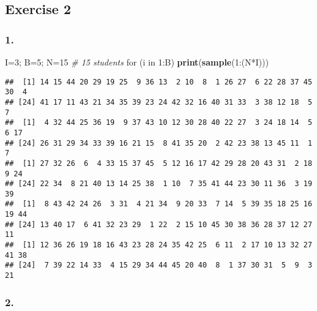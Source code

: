 \documentclass[11pt,]{article}
\newenvironment{Shaded}{\begin{snugshade}}{\end{snugshade}}
\newcommand{\KeywordTok}[1]{\textcolor[rgb]{0.13,0.29,0.53}{\textbf{{#1}}}}
\newcommand{\DecValTok}[1]{\textcolor[rgb]{0.00,0.00,0.81}{{#1}}}
\newcommand{\CommentTok}[1]{\textcolor[rgb]{0.56,0.35,0.01}{\textit{{#1}}}}
\newcommand{\NormalTok}[1]{{#1}}
\begin{document}
\subsection{Exercise 2}\label{exercise-2}

\subsubsection{1.}\label{section-5}

\begin{Shaded}
\begin{Highlighting}[]
\NormalTok{I=}\DecValTok{3}\NormalTok{; B=}\DecValTok{5}\NormalTok{; N=}\DecValTok{15} \CommentTok{# 15 students}
\NormalTok{for (i in }\DecValTok{1}\NormalTok{:B) }\KeywordTok{print}\NormalTok{(}\KeywordTok{sample}\NormalTok{(}\DecValTok{1}\NormalTok{:(N*I)))}
\end{Highlighting}
\end{Shaded}

\begin{verbatim}
##  [1] 14 15 44 20 29 19 25  9 36 13  2 10  8  1 26 27  6 22 28 37 45 30  4
## [24] 41 17 11 43 21 34 35 39 23 24 42 32 16 40 31 33  3 38 12 18  5  7
##  [1]  4 32 44 25 36 19  9 37 43 10 12 30 28 40 22 27  3 24 18 14  5  6 17
## [24] 26 31 29 34 33 39 16 21 15  8 41 35 20  2 42 23 38 13 45 11  1  7
##  [1] 27 32 26  6  4 33 15 37 45  5 12 16 17 42 29 28 20 43 31  2 18  9 24
## [24] 22 34  8 21 40 13 14 25 38  1 10  7 35 41 44 23 30 11 36  3 19 39
##  [1]  8 43 42 24 26  3 31  4 21 34  9 20 33  7 14  5 39 35 18 25 16 19 44
## [24] 13 40 17  6 41 32 23 29  1 22  2 15 10 45 30 38 36 28 37 12 27 11
##  [1] 12 36 26 19 18 16 43 23 28 24 35 42 25  6 11  2 17 10 13 32 27 41 38
## [24]  7 39 22 14 33  4 15 29 34 44 45 20 40  8  1 37 30 31  5  9  3 21
\end{verbatim}

\subsubsection{2.}\label{section-6}
\end{document}
